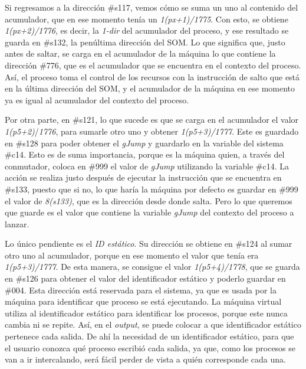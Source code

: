 \documentclass[letterpaper,12pt,oneside]{book}
\begin{document}
		Si regresamos a la dirección \#s117, vemos cómo se suma un uno al contenido del acumulador, que en ese momento
		tenía un \textit{1(px+1)/1775}. Con esto, se obtiene \textit{1(px+2)/1776}, es decir, la \textit{1-dir} del acumulador del proceso, y ese resultado se guarda
		en \#s132, la penúltima dirección del SOM. Lo que significa que, justo antes de saltar, se carga en el acumulador de la máquina lo que contiene
		la dirección \#776, que es el acumulador que se encuentra en el contexto del proceso. Así, el proceso toma el control
		de los recursos con la instrucción de salto que está en la última dirección del SOM, y el acumulador de la máquina en ese momento
		ya es igual al acumulador del contexto del proceso.
  
        Por otra parte, en \#s121, lo que sucede es que se carga
		en el acumulador el valor \textit{1(p5+2)}/\textit{1776}, para sumarle otro uno y obtener \textit{1(p5+3)/1777}. Este es guardado en \#s128 para 
		poder obtener el \textit{gJump} y guardarlo en la variable del sistema \#c14. Esto es de suma importancia, porque es la máquina quien,
		a través del conmutador, coloca en 
		\#999 el valor de \textit{gJump} utilizando la variable \#c14. La acción se realiza justo después
		de ejecutar la instrucción que se encuentra en \#s133, puesto que si no, lo que haría la máquina por defecto es guardar en \#999 el valor de 
		\textit{8(s133)}, que es la dirección desde donde salta. Pero lo que
		queremos que guarde es el valor que contiene la variable \textit{gJump} del contexto del proceso a lanzar.
		
		Lo único pendiente es el \textit{ID estático}. Su dirección se obtiene en \#s124 al sumar otro uno al acumulador, 
		porque en ese momento el valor que tenía
		era \textit{1(p5+3)/1777}. De esta manera, se consigue el valor \textit{1(p5+4)/1778}, que se guarda en \#s126 para obtener el valor del 
		identificador estático y poderlo guardar
		en \#004. Esta dirección está reservada para el sistema, ya que es usada por la máquina para identificar que proceso se está ejecutando.
		La máquina virtual utiliza al
		identificador estático para identificar los procesos, porque este nunca cambia ni se repite. Así, en el \textit{output}, 
		se puede colocar a que identificador estático pertenece cada salida. De ahí la necesidad
		de un identificador estático, para que el usuario conozca qué proceso escribió cada salida, ya que,  como los procesos
		se van a ir intercalando, será fácil
		perder de vista a quién corresponde cada una.
  
\end{document}
